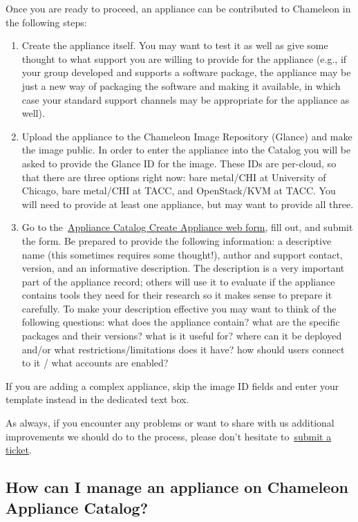 Once you are ready to proceed, an appliance can be contributed to
Chameleon in the following steps:

\begin{enumerate}
\tightlist
\item
  Create the appliance itself. You may want to test it as well as give
  some thought to what support you are willing to provide for the
  appliance (e.g., if your group developed and supports a software
  package, the appliance may be just a new way of packaging the software
  and making it available, in which case your standard support channels
  may be appropriate for the appliance as well).
\item
  Upload the appliance to the Chameleon Image Repository (Glance) and
  make the image public. In order to enter the appliance into the
  Catalog you will be asked to provide the Glance ID for the image.
  These IDs are per-cloud, so that there are three options right now:
  bare metal/CHI at University of Chicago, bare metal/CHI at TACC, and
  OpenStack/KVM at TACC. You will need to provide at least one
  appliance, but may want to provide all three.
\item
  Go to
  the~\href{https://www.chameleoncloud.org/appliances/create/}{Appliance
  Catalog Create Appliance web form}, fill out, and submit the form. Be
  prepared to provide the following information: a descriptive name
  (this sometimes requires some thought!), author and support contact,
  version, and an informative description. The description is a very
  important part of the appliance record; others will use it to evaluate
  if the appliance contains tools they need for their research so it
  makes sense to prepare it carefully. To make your description
  effective you may want to think of the following questions: what does
  the appliance contain? what are the specific packages and their
  versions? what is it useful for? where can it be deployed and/or what
  restrictions/limitations does it have? how should users connect to it
  / what accounts are enabled?
\end{enumerate}

If you are adding a complex appliance, skip the image ID fields and
enter your template instead in the dedicated text box.

As always, if you encounter any problems or want to share with us
additional improvements we should do to the process, please don't
hesitate to~\href{https://www.chameleoncloud.org/help/}{submit a
ticket}.~

\subsection{How can I manage an appliance on Chameleon Appliance
Catalog?}\label{how-can-i-manage-an-appliance-on-chameleon-appliance-catalog}

